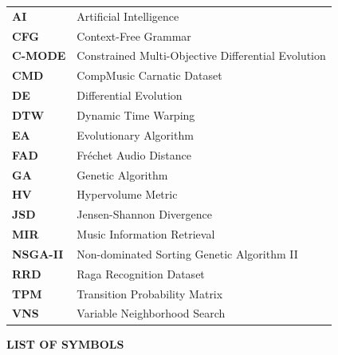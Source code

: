 \documentclass[12pt,a4paper]{report}
\begin{document}
\noindent
\begin{tabular}{@{}ll@{}}
\textbf{AI} & Artificial Intelligence \\
\textbf{CFG} & Context-Free Grammar \\
\textbf{C-MODE} & Constrained Multi-Objective Differential Evolution \\
\textbf{CMD} & CompMusic Carnatic Dataset \\
\textbf{DE} & Differential Evolution \\
\textbf{DTW} & Dynamic Time Warping \\
\textbf{EA} & Evolutionary Algorithm \\
\textbf{FAD} & Fr{\'e}chet Audio Distance \\
\textbf{GA} & Genetic Algorithm \\
\textbf{HV} & Hypervolume Metric \\
\textbf{JSD} & Jensen-Shannon Divergence \\
\textbf{MIR} & Music Information Retrieval \\
\textbf{NSGA-II} & Non-dominated Sorting Genetic Algorithm II \\
\textbf{RRD} & Raga Recognition Dataset \\
\textbf{TPM} & Transition Probability Matrix \\
\textbf{VNS} & Variable Neighborhood Search \\
\end{tabular}

\newpage
\begin{center}
{\Large \bfseries LIST OF SYMBOLS \par}
\end{center}
\vspace{0.8cm}
\end{document}
